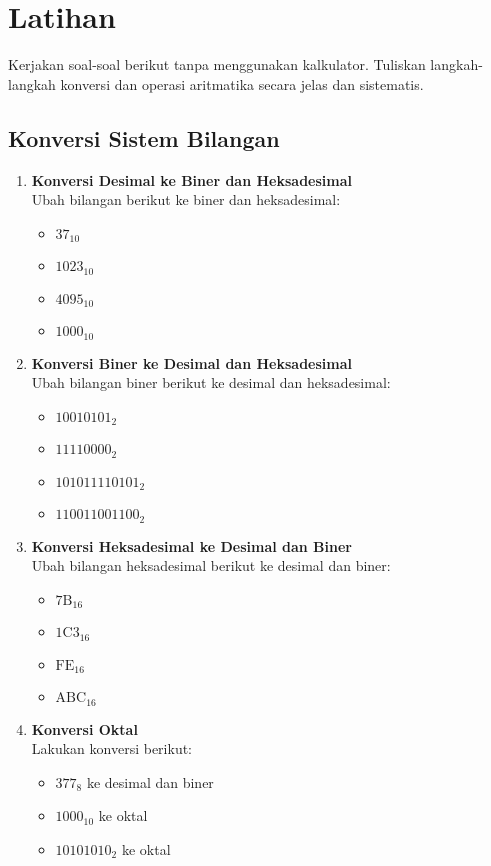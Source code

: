 \documentclass[../main.tex]{subfiles}
\begin{document}
\section{Latihan}

Kerjakan soal-soal berikut tanpa menggunakan kalkulator. Tuliskan langkah-langkah konversi dan operasi aritmatika secara jelas dan sistematis.

\subsection{Konversi Sistem Bilangan}

\begin{enumerate}
    \item \textbf{Konversi Desimal ke Biner dan Heksadesimal}\\
    Ubah bilangan berikut ke biner dan heksadesimal:
    \begin{itemize}
        \item \(37_{10}\)
        \item \(1023_{10}\)
        \item \(4095_{10}\)
        \item \(1000_{10}\)
    \end{itemize}

    \item \textbf{Konversi Biner ke Desimal dan Heksadesimal}\\
    Ubah bilangan biner berikut ke desimal dan heksadesimal:
    \begin{itemize}
        \item \(10010101_2\)
        \item \(11110000_2\)
        \item \(101011110101_2\)
        \item \(110011001100_2\)
    \end{itemize}

    \item \textbf{Konversi Heksadesimal ke Desimal dan Biner}\\
    Ubah bilangan heksadesimal berikut ke desimal dan biner:
    \begin{itemize}
        \item \(\mathrm{7B}_{16}\)
        \item \(\mathrm{1C3}_{16}\)
        \item \(\mathrm{FE}_{16}\)
        \item \(\mathrm{ABC}_{16}\)
    \end{itemize}

    \item \textbf{Konversi Oktal}\\
    Lakukan konversi berikut:
    \begin{itemize}
        \item \(377_8\) ke desimal dan biner
        \item \(1000_{10}\) ke oktal
        \item \(10101010_2\) ke oktal
    \end{itemize}
\end{enumerate}
\end{document}
